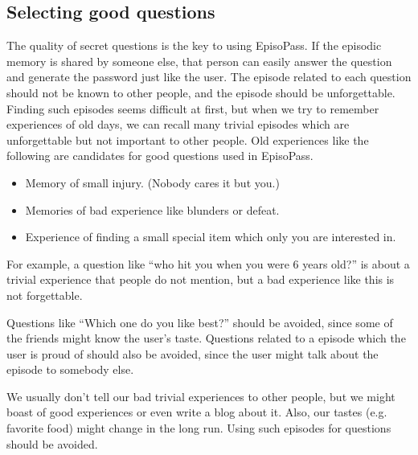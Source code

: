 \documentclass{sigchi}
\begin{document}
\subsection{Selecting good questions}


The quality of secret questions is the key to using EpisoPass.
If the episodic memory is shared by someone else,
that person can easily answer the question and generate the
password just like the user.
%
The episode related to each question should not be known to other people,
and the episode should be unforgettable.
%
Finding such episodes seems difficult at first, but
when we try to remember experiences of old days,
we can recall many trivial episodes which are unforgettable but
not important to other people.
%
Old experiences like the following are candidates for
good questions used in EpisoPass.

\begin{itemize}
\item Memory of small injury. (Nobody cares it but you.)

\item Memories of bad experience like blunders or defeat.

\item Experience of finding a small special item which only you are interested in.
\end{itemize}

For example, a question like
``who hit you when you were 6 years old?''
is about a trivial experience that people do not mention,
but a bad experience like this is not forgettable.

Questions like ``Which one do you like best?'' should be avoided,
since some of the friends might know the user's taste.
Questions related to a episode which the user is proud of should also be
avoided, since the user might talk about the episode to somebody else.

We usually don't tell our bad trivial experiences to other people,
but we might boast of good experiences or even write a blog about it.
Also, our tastes (e.g. favorite food) might change in the long run.
Using such episodes for questions should be avoided.

% 
% 
% 
% 
\end{document}
